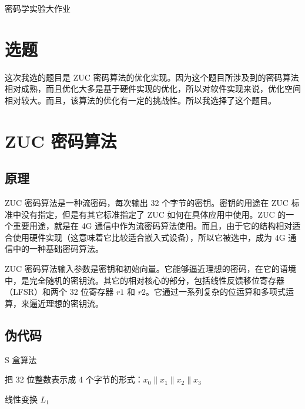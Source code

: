 \documentclass[a4paper, 10pt]{article}
\begin{document}
{
\begin{center}
密码学实验大作业
\end{center}
}

\section*{选题}

这次我选的题目是 ZUC 密码算法的优化实现。因为这个题目所涉及到的密码算法相对成熟，而且优化大多是基于硬件实现的优化，所以对软件实现来说，优化空间相对较大。而且，该算法的优化有一定的挑战性。所以我选择了这个题目。

\section*{ZUC 密码算法}

\subsection*{原理}

ZUC 密码算法是一种流密码，每次输出 32 个字节的密钥。密钥的用途在 ZUC 标准中没有指定，但是有其它标准指定了 ZUC 如何在具体应用中使用。ZUC 的一个重要用途，就是在 4G 通信中作为流密码算法使用。而且，由于它的结构相对适合使用硬件实现（这意味着它比较适合嵌入式设备），所以它被选中，成为 4G 通信中的一种基础密码算法。

ZUC 密码算法输入参数是密钥和初始向量。它能够逼近理想的密码，在它的语境中，是完全随机的密钥流。其它的相对核心的部分，包括线性反馈移位寄存器（LFSR）和两个 32 位寄存器 $ r1 $ 和 $ r2 $。它通过一系列复杂的位运算和多项式运算，来逼近理想的密钥流。

\subsection*{伪代码}

\begin{algorithm}
\caption{S 盒算法}

把 32 位整数表示成 4 个字节的形式：$ x_0 \parallel x_1 \parallel x_2 \parallel x_3 $


\end{algorithm}

\begin{algorithm}
\caption{线性变换 $ L_1 $}

\end{algorithm}
\end{document}
